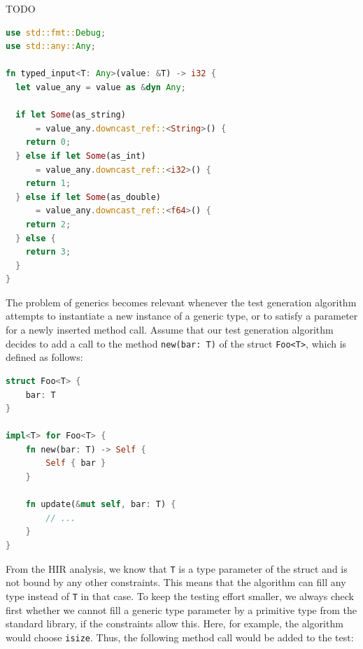 \documentclass[paper=a4,%
  twoside,%
  BCOR4mm,%
  abstract=true,%
  toc=bibliography,%
  chapterprefix=true,%
  toc=bibliographynumbered,%
  open=right,%
  english,%
  pagesize=pdftex]{scrreprt}
\begin{document}
TODO

\begin{lstlisting}[language=Rust, style=boxed, caption={The execution path of the generic Rust function depends on the concrete type of the argument}, label=lst:rust-runtime-reflection]
use std::fmt::Debug;
use std::any::Any;

fn typed_input<T: Any>(value: &T) -> i32 {
  let value_any = value as &dyn Any;

  if let Some(as_string)
      = value_any.downcast_ref::<String>() {
    return 0;
  } else if let Some(as_int)
      = value_any.downcast_ref::<i32>() {
    return 1;
  } else if let Some(as_double)
      = value_any.downcast_ref::<f64>() {
    return 2;
  } else {
    return 3;
  }
}
\end{lstlisting}

The problem of generics becomes relevant whenever the test generation algorithm attempts to instantiate a new instance of a generic type, or to satisfy a parameter for a newly inserted method call. Assume that our test generation algorithm decides to add a call to the method \lstinline{new(bar: T)} of the struct \lstinline{Foo<T>}, which is defined as follows:
\begin{lstlisting}[language=Rust, style=boxed, caption={}, label=lst:basic-generics-example]
struct Foo<T> {
    bar: T
}

impl<T> for Foo<T> {
    fn new(bar: T) -> Self {
        Self { bar }
    }

    fn update(&mut self, bar: T) {
        // ...
    }
}
\end{lstlisting}


From the \ac{HIR} analysis, we know that \lstinline{T} is a type parameter of the struct and is not bound by any other constraints. This means that the algorithm can fill any type instead of \lstinline{T} in that case. To keep the testing effort smaller, we always check first whether we cannot fill a generic type parameter by a primitive type from the standard library, if the constraints allow this. Here, for example, the algorithm would choose \lstinline{isize}. Thus, the following method call would be added to the test:
\end{document}
